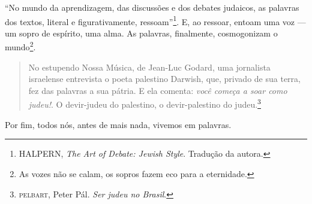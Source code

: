 

\begin{center}\end{center}

\noindent{}``No mundo da aprendizagem, das discussões e dos debates judaicos,
as palavras dos textos, literal e figurativamente,
ressoam''\footnote{HALPERN, \emph{The Art of Debate: Jewish Style}. Tradução da autora.}. E, ao ressoar, entoam uma voz --- um sopro de
espírito, uma alma. As palavras, finalmente, cosmogonizam o
mundo\footnote{As vozes não se calam, os sopros fazem eco para a
  eternidade.}.

\begin{quote}
No estupendo Nossa Música, de Jean-Luc
Godard, uma jornalista israelense entrevista o poeta palestino Darwish,
que, privado de sua terra, fez das palavras a sua pátria. E ela comenta:
\emph{você começa a soar como judeu!}. O devir-judeu do palestino, o
devir-palestino do judeu.\footnote{\textsc{pelbart}, Peter Pál. \emph{Ser judeu
  no Brasil}.}
\end{quote}

Por fim, todos nós, antes de mais nada, vivemos em palavras.